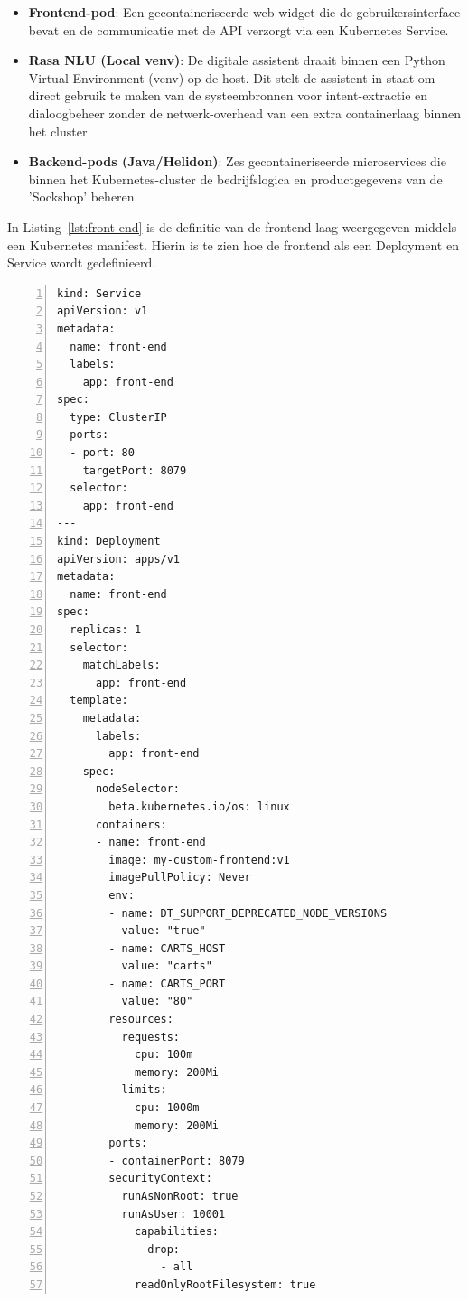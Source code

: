 \begin{itemize}
    \item \textbf{Frontend-pod}: Een gecontaineriseerde web-widget die de gebruikersinterface bevat en de communicatie met de API verzorgt via een Kubernetes Service.
    \item \textbf{Rasa NLU (Local venv)}: De digitale assistent draait binnen een Python Virtual Environment (venv) op de host. Dit stelt de assistent in staat om direct gebruik te maken van de systeembronnen voor intent-extractie en dialoogbeheer zonder de netwerk-overhead van een extra containerlaag binnen het cluster.
    \item \textbf{Backend-pods (Java/Helidon)}: Zes gecontaineriseerde microservices die binnen het Kubernetes-cluster de bedrijfslogica en productgegevens van de 'Sockshop' beheren.
\end{itemize}

In Listing~\ref{lst:front-end} is de definitie van de frontend-laag weergegeven middels een Kubernetes manifest. Hierin is te zien hoe de frontend als een Deployment en Service wordt gedefinieerd.

\begin{lstlisting}[language={}, caption={Kubernetes manifest voor de frontend-laag met custom web-widget}, label={lst:front-end}, breaklines=true, numbers=left,frame=single]
kind: Service
apiVersion: v1
metadata:
  name: front-end
  labels:
    app: front-end
spec:
  type: ClusterIP
  ports:
  - port: 80
    targetPort: 8079
  selector:
    app: front-end
---
kind: Deployment
apiVersion: apps/v1
metadata:
  name: front-end
spec:
  replicas: 1
  selector:
    matchLabels:
      app: front-end
  template:
    metadata:
      labels:
        app: front-end
    spec:
      nodeSelector:
        beta.kubernetes.io/os: linux
      containers:
      - name: front-end
        image: my-custom-frontend:v1
        imagePullPolicy: Never
        env:
        - name: DT_SUPPORT_DEPRECATED_NODE_VERSIONS
          value: "true"
        - name: CARTS_HOST
          value: "carts"
        - name: CARTS_PORT
          value: "80"
        resources:
          requests:
            cpu: 100m
            memory: 200Mi
          limits:
            cpu: 1000m
            memory: 200Mi
        ports:
        - containerPort: 8079
        securityContext:
          runAsNonRoot: true
          runAsUser: 10001
            capabilities:
              drop:
                - all
            readOnlyRootFilesystem: true
\end{lstlisting}

